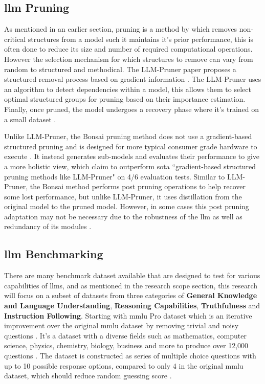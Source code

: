 \documentclass{ifacconf}
\begin{document}
	\subsection{\gls{llm} Pruning}
	As mentioned in an earlier section, pruning is a method by which removes non-critical structures from a model such it maintains it's prior performance, this is often done to reduce its size and number of required computational operations. However the selection mechanism for which structures to remove can vary from random to structured and methodical. The LLM-Pruner paper proposes a structured removal process based on gradient information \cite{ma2023llmprunerstructuralpruninglarge}. The LLM-Pruner uses an algorithm to detect dependencies within a model, this allows them to select optimal structured groups for pruning based on their importance estimation. Finally, once pruned, the model undergoes a recovery phase where it's trained on a small dataset \cite{ma2023llmprunerstructuralpruninglarge}. 
	
	Unlike LLM-Pruner, the Bonsai pruning method does not use a gradient-based structured pruning and is designed for more typical consumer grade hardware to execute \cite{dery2024everybodyprunenowstructured}. It instead generates sub-models and evaluates their performance to give a more holistic view, which claim to outperform \gls{sota} ``gradient-based structured pruning methods like LLM-Pruner" \cite[p.~2]{dery2024everybodyprunenowstructured} on 4/6 evaluation tests. Similar to LLM-Pruner, the Bonsai method performs post pruning operations to help recover some lost performance, but unlike LLM-Pruner, it uses distillation from the original model to the pruned model. However, in some cases this post pruning adaptation may not be necessary due to the robustness of the \gls{llm} as well as redundancy of its modules \cite{dery2024everybodyprunenowstructured}.
	
	\subsection{\gls{llm} Benchmarking}
	
	There are many benchmark dataset available that are designed to test for various capabilities of \glspl{llm}, and as mentioned in the research scope section, this research will focus on a subset of datasets from three categories of \textbf{General Knowledge and Language Understanding}, \textbf{Reasoning Capabilities}, \textbf{Truthfulness} and \textbf{Instruction Following}. Starting with \gls{mmlu} Pro dataset which is an iterative improvement over the original \gls{mmlu} dataset by removing trivial and noisy questions \cite{wang2024mmluprorobustchallengingmultitask}. It's a dataset with a diverse fields such as mathematics, computer science, physics, chemistry, biology, business and more to produce over 12,000 questions \cite{wang2024mmluprorobustchallengingmultitask}. The dataset is constructed as series of multiple choice questions with up to 10 possible response options, compared to only 4 in the original \gls{mmlu} dataset, which should reduce random guessing score \cite{mmluprohuggingface}.
	
\end{document}
